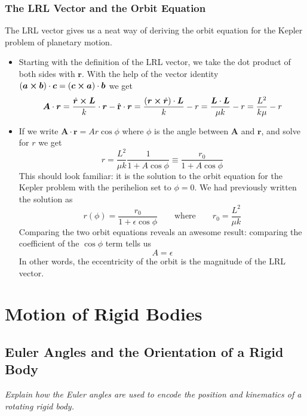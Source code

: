 \documentclass[11pt, a4paper]{article}
\newcommand{\eqtext}[1]{\qquad \text{#1} \qquad}
\newcommand{\uvec}[1]{\hat{\mathbf{#1}}}
\newcommand{\bdot}[1]{\dot{\bm{#1}}}
\begin{document}
\subsubsection{The LRL Vector and the Orbit Equation}
The LRL vector gives us a neat way of deriving the orbit equation for the Kepler problem of planetary motion.
\begin{itemize}
	\item Starting with the definition of the LRL vector, we take the dot product of both sides with $ \bm{r} $. With the help of the vector identity $ (\bm{a} \cross \bm{b}) \cdot \bm{c} = (\bm{c} \cross \bm{a}) \cdot \bm{b}$ we get
	\begin{equation*}
		\bm{A}\cdot\bm{r} =  \frac{\bdot{r} \cross \bm{L}}{k}\cdot\bm{r} - \uvec{r} \cdot\bm{r} = \frac{(\bm{r} \cross \bdot{r})\cdot\bm{L}}{k} - r = \frac{\bm{L}\cdot\bm{L}}{\mu k} - r = \frac{L^{2}}{k \mu} - r
	\end{equation*}
	
	\item If we write $ \bm{A} \cdot \bm{r} = A r \cos \phi $ where $ \phi $ is the angle between $ \bm{A} $ and $ \bm{r} $, and solve for $ r $ we get
	\begin{equation*}
		r = \frac{L^{2}}{\mu k}\frac{1}{1 + A \cos \phi} \equiv \frac{r_{0}}{1 + A \cos \phi} 
	\end{equation*}
	This should look familiar: it is the solution to the orbit equation for the Kepler problem with the perihelion set to $ \phi = 0 $. We had previously written the solution as
	\begin{equation*}
		r(\phi) = \frac{r_{0}}{1 + \epsilon \cos \phi} \eqtext{where} r_{0} = \frac{L^{2}}{\mu k}
	\end{equation*}
	Comparing the two orbit equations reveals an awesome result: comparing the coefficient of the $ \cos \phi $ term tells us
	\begin{equation*}
		A = \epsilon
	\end{equation*}
	In other words, the eccentricity of the orbit is the magnitude of the LRL vector.
\end{itemize}

\newpage
\section{Motion of Rigid Bodies}

\subsection{Euler Angles and the Orientation of a Rigid Body}
\textit{Explain how the Euler angles are used to encode the position and kinematics of a rotating rigid body.}
\end{document}
